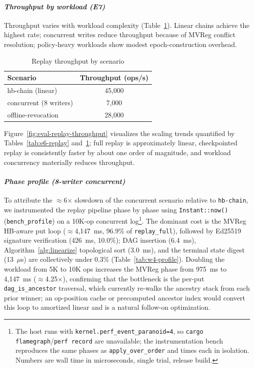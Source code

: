 \documentclass[10pt,journal,compsoc]{IEEEtran}
\begin{document}
\paragraph*{\textbf{\textit{Throughput by workload (E7)}}}
Throughput varies with workload complexity (Table~\ref{tab:e7-throughput}). Linear chains achieve the highest rate; concurrent writes reduce throughput because of MVReg conflict resolution; policy-heavy workloads show modest epoch-construction overhead.

\begin{table}[!htbp]
\centering
\caption{Replay throughput by scenario}
\label{tab:e7-throughput}
\begin{tabular}{@{}lc@{}}
\toprule
\textbf{Scenario} & \textbf{Throughput (ops/s)} \\
\midrule
hb-chain (linear)           & 45,000 \\
concurrent (8 writers)      & 7,000  \\
offline-revocation          & 28,000 \\
\bottomrule
\end{tabular}
\end{table}

Figure~\ref{fig:eval-replay-throughput} visualizes the scaling trends quantified by Tables~\ref{tab:e6-replay} and~\ref{tab:e7-throughput}; full replay is approximately linear, checkpointed replay is consistently faster by about one order of magnitude, and workload concurrency materially reduces throughput.

\paragraph*{\textbf{\textit{Phase profile (8-writer concurrent)}}}
To attribute the $\approx$6$\times$ slowdown of the concurrent scenario relative to \texttt{hb-chain}, we instrumented the replay pipeline phase by phase using \texttt{Instant::now()} (\texttt{bench\_profile}) on a 10K-op concurrent log\footnote{The host runs with \texttt{kernel.perf\_event\_paranoid=4}, so \texttt{cargo flamegraph}/\texttt{perf record} are unavailable; the instrumentation bench reproduces the same phases as \texttt{apply\_over\_order} and times each in isolation. Numbers are wall time in microseconds, single trial, release build.}. The dominant cost is the MVReg HB-aware put loop ($\approx$4{,}147~ms, 96.9\% of \texttt{replay\_full}), followed by Ed25519 signature verification (426~ms, 10.0\%); DAG insertion (6.4~ms), Algorithm~\ref{alg:linearize} topological sort (3.0~ms), and the terminal state digest (13~$\mu$s) are collectively under 0.3\% (Table~\ref{tab:w4-profile}). Doubling the workload from 5K to 10K ops increases the MVReg phase from 975~ms to 4{,}147~ms ($\approx$4.25$\times$), confirming that the bottleneck is the per-put \texttt{dag\_is\_ancestor} traversal, which currently re-walks the ancestry stack from each prior winner; an op-position cache or precomputed ancestor index would convert this loop to amortized linear and is a natural follow-on optimization.
\end{document}
